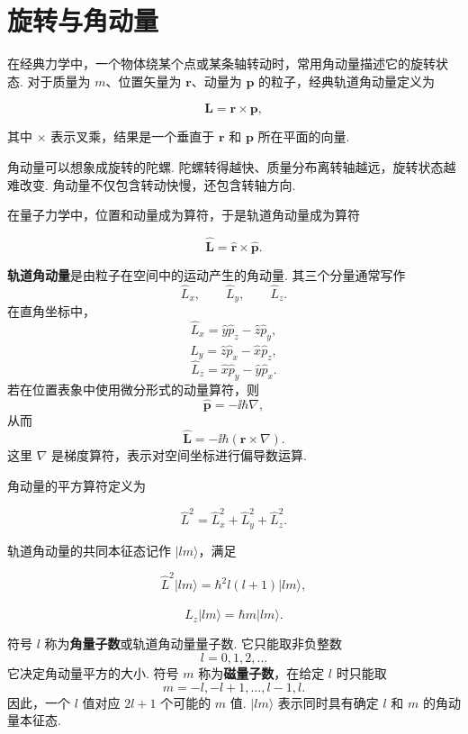 \documentclass[UTF8,11pt,a4paper,openany]{ctexbook}
\newcommand{\ket}[1]{\lvert #1\rangle}\newcommand{\bra}[1]{\langle #1\rvert}
\newcommand{\term}[1]{\textbf{#1}}
\begin{document}
\section{旋转与角动量}

在经典力学中，一个物体绕某个点或某条轴转动时，常用角动量描述它的旋转状态. 对于质量为 $m$、位置矢量为 $\boldsymbol r$、动量为 $\boldsymbol p$ 的粒子，经典轨道角动量定义为

\[
\boldsymbol L=\boldsymbol r\times\boldsymbol p,
\]

其中 $\times$ 表示叉乘，结果是一个垂直于 $\boldsymbol r$ 和 $\boldsymbol p$ 所在平面的向量. 

\begin{analogybox}
角动量可以想象成旋转的陀螺. 陀螺转得越快、质量分布离转轴越远，旋转状态越难改变. 角动量不仅包含转动快慢，还包含转轴方向. 
\end{analogybox}

在量子力学中，位置和动量成为算符，于是轨道角动量成为算符

\[
\hat{\boldsymbol L}
=\hat{\boldsymbol r}\times\hat{\boldsymbol p}.
\]

\begin{definitionbox}
\term{轨道角动量}是由粒子在空间中的运动产生的角动量. 其三个分量通常写作
\[
\hat L_x,\qquad \hat L_y,\qquad \hat L_z.
\]
在直角坐标中，
\[
\hat L_x=\hat y\hat p_z-\hat z\hat p_y,
\]
\[
\hat L_y=\hat z\hat p_x-\hat x\hat p_z,
\]
\[
\hat L_z=\hat x\hat p_y-\hat y\hat p_x.
\]
若在位置表象中使用微分形式的动量算符，则
\[
\hat{\boldsymbol p}=-\ii\hbar\nabla,
\]
从而
\[
\hat{\boldsymbol L}=-\ii\hbar(\boldsymbol r\times\nabla).
\]
这里 $\nabla$ 是梯度算符，表示对空间坐标进行偏导数运算. 
\end{definitionbox}

角动量的平方算符定义为

\[
\hat L^2=\hat L_x^2+\hat L_y^2+\hat L_z^2.
\]

轨道角动量的共同本征态记作 $\ket{lm}$，满足

\[
\hat L^2\ket{lm}
=\hbar^2l(l+1)\ket{lm},
\]

\[
\hat L_z\ket{lm}
=\hbar m\ket{lm}.
\]

\begin{notationbox}
符号 $l$ 称为\term{角量子数}或轨道角动量量子数. 它只能取非负整数
\[
l=0,1,2,\ldots
\]
它决定角动量平方的大小. 符号 $m$ 称为\term{磁量子数}，在给定 $l$ 时只能取
\[
m=-l,-l+1,\ldots,l-1,l.
\]
因此，一个 $l$ 值对应 $2l+1$ 个可能的 $m$ 值. $\ket{lm}$ 表示同时具有确定 $l$ 和 $m$ 的角动量本征态. 
\end{notationbox}
\end{document}
